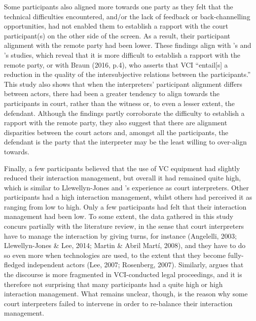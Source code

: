 \documentclass[output=paper]{langsci/langscibook}
\begin{document}
Some participants also aligned more towards one party as they felt that the technical difficulties encountered, and/or the lack of feedback or back-channelling opportunities, had not enabled them to establish a rapport with the court participant(s) on the other side of the screen. As a result, their participant alignment with the remote party had been lower. These findings align with \citet{Rombouts2011}’s and \citet{Napier2011}’s studies, which reveal that it is more difficult to establish a rapport with the remote party, or with Braun (2016, p.4), who asserts that VCI “entail[s] a reduction in the quality of the intersubjective relations between the participants.” This study also shows that when the interpreters’ participant alignment differs between actors, there had been a greater tendency to align towards the participants in court, rather than the witness or, to even a lesser extent, the defendant. Although the findings partly corroborate the difficulty to establish a rapport with the remote party, they also suggest that there are alignment disparities between the court actors and, amongst all the participants, the defendant is the party that the interpreter may be the least willing to over-align towards.

Finally, a few participants believed that the use of VC equipment had slightly reduced their interaction management, but overall it had remained quite high, which is similar to Llewellyn-Jones and \citet{Lee2014}’s experience as court interpreters. Other participants had a high interaction management, whilst others had perceived it as ranging from low to high. Only a few participants had felt that their interaction management had been low. To some extent, the data gathered in this study concurs partially with the literature review, in the sense that court interpreters have to manage the interaction by giving turns, for instance (Angelelli, 2003; Llewellyn-Jones \& Lee, 2014; Martin \& Abril Martí, 2008), and they have to do so even more when technologies are used, to the extent that they become fully-fledged independent actors (Lee, 2007; Rosenberg, 2007). Similarly, \citet{Braun2016} argues that the discourse is more fragmented in VCI-conducted legal proceedings, and it is therefore not surprising that many participants had a quite high or high interaction management. What remains unclear, though, is the reason why some court interpreters failed to intervene in order to re-balance their interaction management. 
\end{document}
